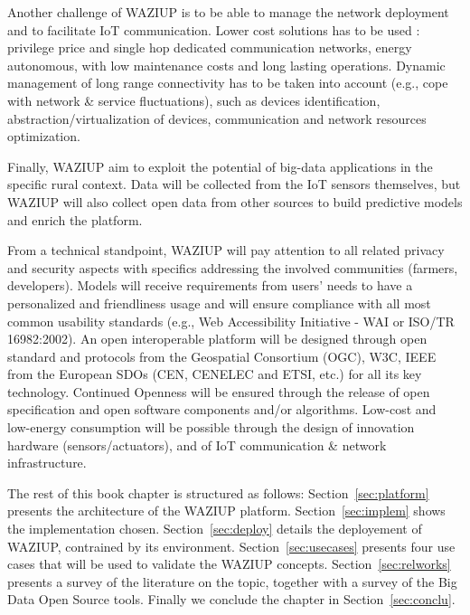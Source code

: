 Another challenge of WAZIUP is to be able to manage the network deployment and to facilitate IoT communication. 
Lower cost solutions has to be used : privilege price and single hop dedicated communication networks, energy autonomous, with low maintenance costs and long lasting operations.
Dynamic management of long range connectivity has to be taken into account (e.g., cope with network \& service fluctuations), such as devices identification, abstraction/virtualization of devices, communication and network resources optimization.

Finally, WAZIUP aim to exploit the potential of big-data applications in the specific rural context. Data will be collected from the IoT sensors themselves, but WAZIUP will also collect open data from other sources to build predictive models and enrich the platform. 


From a technical standpoint, WAZIUP will pay attention to all related privacy and security aspects with specifics addressing the involved communities (farmers, developers).
Models will receive requirements from users’ needs to have a personalized and friendliness usage and will ensure compliance with all most common usability standards (e.g., Web Accessibility Initiative - WAI or ISO/TR 16982:2002). 
An open interoperable platform will be designed through open standard and protocols from the Geospatial Consortium (OGC), W3C, IEEE from the European SDOs (CEN, CENELEC and ETSI, etc.) for all its key technology.
Continued Openness will be ensured through the release of open specification and open software components and/or algorithms.
Low-cost and low-energy consumption will be possible through the design of innovation hardware (sensors/actuators), and of IoT communication \& network infrastructure.


The rest of this book chapter is structured as follows: Section~\ref{sec:platform} presents the architecture of the WAZIUP platform. 
Section~\ref{sec:implem} shows the implementation chosen. 
Section~\ref{sec:deploy} details the deployement of WAZIUP, contrained by its environment.
Section~\ref{sec:usecases} presents four use cases that will be used to validate the WAZIUP concepts.
Section~\ref{sec:relworks} presents a survey of the literature on the topic, together with a survey of the Big Data Open Source tools.
Finally we conclude the chapter in Section~\ref{sec:conclu}.
